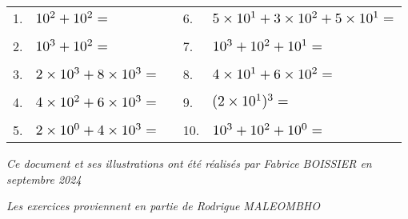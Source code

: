 \documentclass[11pt,a4paper]{article}
\begin{document}
\bigskip

\begin{tabular}{ l l  C{3cm}  l l }
1. & $ \Scale[1.25]{ 10^{2} + 10^{2} = } $                   & &  6. & $ \Scale[1.25]{ 5 \times 10^{1} + 3 \times 10^{2} + 5 \times 10^{1} = } $ \\
 & & & & \\
2. & $ \Scale[1.25]{ 10^{3} + 10^{2} = } $                   & &  7. & $ \Scale[1.25]{ 10^{3} + 10^{2} + 10^{1} = } $ \\
 & & & & \\
3. & $ \Scale[1.25]{ 2 \times 10^{3} + 8 \times 10^{3} = } $ & &  8. & $ \Scale[1.25]{ 4 \times 10^{1} + 6 \times 10^{2} = } $ \\
 & & & & \\
4. & $ \Scale[1.25]{ 4 \times 10^{2} + 6 \times 10^{3} = } $ & &  9. & $ \Scale[1.25]{ (2 \times 10^{1})^{3} = } $ \\
 & & & & \\
5. & $ \Scale[1.25]{ 2 \times 10^{0} + 4 \times 10^{3} = } $ & & 10. & $ \Scale[1.25]{ 10^{3} + 10^{2} + 10^{0} = } $ \\
\end{tabular}



\bigskip

\begin{center}
\textit{Ce document et ses illustrations ont été réalisés par Fabrice BOISSIER en septembre 2024}

\textit{Les exercices proviennent en partie de Rodrigue MALEOMBHO}
\end{center}
\end{document}
